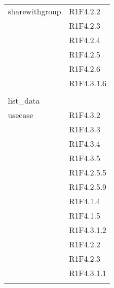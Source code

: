 \begin{center}
\begin{longtable}{|p{7cm}|p{5cm}|}
		sharewithgroup & R1F4.2.2 \\ & R1F4.2.3 \\ & R1F4.2.4 \\ & R1F4.2.5 \\ & R1F4.2.6 \\ & R1F4.3.1.6 \\ & \\ \hline
		list\_data & \\ \hline
		usecase & R1F4.3.2 \\ & R1F4.3.3 \\ & R1F4.3.4 \\ & R1F4.3.5 \\ & R1F4.2.5.5 \\ & R1F4.2.5.9 \\ & R1F4.1.4 \\ & R1F4.1.5 \\ & R1F4.3.1.2 \\ & R1F4.2.2 \\ & R1F4.2.3 \\ & R1F4.3.1.1 \\ & \\ \hline
	\end{longtable}
\end{center}

